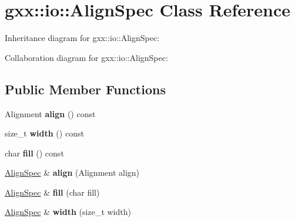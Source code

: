 \hypertarget{classgxx_1_1io_1_1AlignSpec}{}\section{gxx\+:\+:io\+:\+:Align\+Spec Class Reference}
\label{classgxx_1_1io_1_1AlignSpec}


Inheritance diagram for gxx\+:\+:io\+:\+:Align\+Spec\+:


Collaboration diagram for gxx\+:\+:io\+:\+:Align\+Spec\+:
\subsection*{Public Member Functions}
\begin{DoxyCompactItemize}
\item 
Alignment {\bfseries align} () const \hypertarget{classgxx_1_1io_1_1AlignSpec_afa7b7b5e2307afc61fa158f33587cfa4}{}\label{classgxx_1_1io_1_1AlignSpec_afa7b7b5e2307afc61fa158f33587cfa4}

\item 
size\+\_\+t {\bfseries width} () const \hypertarget{classgxx_1_1io_1_1AlignSpec_a4025e3512a41207919ba0710aac5004e}{}\label{classgxx_1_1io_1_1AlignSpec_a4025e3512a41207919ba0710aac5004e}

\item 
char {\bfseries fill} () const \hypertarget{classgxx_1_1io_1_1AlignSpec_a055233b3c0e5558ba2bbfd1b6b2da858}{}\label{classgxx_1_1io_1_1AlignSpec_a055233b3c0e5558ba2bbfd1b6b2da858}

\item 
\hyperlink{classgxx_1_1io_1_1AlignSpec}{Align\+Spec} \& {\bfseries align} (Alignment align)\hypertarget{classgxx_1_1io_1_1AlignSpec_aaeae9560ec73fe1d3bcfbf556fc47e26}{}\label{classgxx_1_1io_1_1AlignSpec_aaeae9560ec73fe1d3bcfbf556fc47e26}

\item 
\hyperlink{classgxx_1_1io_1_1AlignSpec}{Align\+Spec} \& {\bfseries fill} (char fill)\hypertarget{classgxx_1_1io_1_1AlignSpec_a6f82e3aab453ce2ea5d93e37da6f3b01}{}\label{classgxx_1_1io_1_1AlignSpec_a6f82e3aab453ce2ea5d93e37da6f3b01}

\item 
\hyperlink{classgxx_1_1io_1_1AlignSpec}{Align\+Spec} \& {\bfseries width} (size\+\_\+t width)\hypertarget{classgxx_1_1io_1_1AlignSpec_a0cd7069f31fe0c417633f96c527b242b}{}\label{classgxx_1_1io_1_1AlignSpec_a0cd7069f31fe0c417633f96c527b242b}


\end{DoxyCompactItemize}
